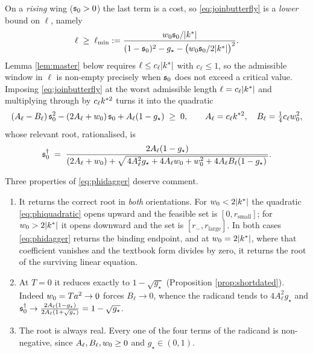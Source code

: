 On a \emph{rising} wing ($\mathfrak{s}_{0}>0$) the last term is a cost, so \eqref{eq:joinbutterfly} is a
\emph{lower} bound on $\ell$, namely
\begin{equation}\label{eq:ellmin}
  \ell\;\ge\;\ell_{\min}:=\frac{w_{0}\mathfrak{s}_{0}/|k^{*}|}
  {(1-\mathfrak{s}_{0})^{2}-g_{\star}-\bigl(w_{0}\mathfrak{s}_{0}/2|k^{*}|\bigr)^{2}} .
\end{equation}
Lemma \ref{lem:master} below requires $\ell\le c_{\ell}|k^{*}|$ with $c_{\ell}\le1$, so the
admissible window in $\ell$ is non-empty precisely when $\mathfrak{s}_{0}$ does not exceed a critical
value. Imposing \eqref{eq:joinbutterfly} at the worst admissible length $\ell=c_{\ell}|k^{*}|$ and
multiplying through by $c_{\ell}k^{*2}$ turns it into the quadratic
\begin{equation}\label{eq:phiquadratic}
  (A_{\ell}-B_{\ell})\,\mathfrak{s}_{0}^{2}-(2A_{\ell}+w_{0})\,\mathfrak{s}_{0}+A_{\ell}(1-g_{\star})\;\ge\;0,
  \qquad A_{\ell}=c_{\ell}k^{*2},\quad B_{\ell}=\tfrac14 c_{\ell}w_{0}^{2},
\end{equation}
whose relevant root, rationalised, is
\begin{equation}
  \mathfrak{s}_{0}^{\dagger}
  \;=\;\frac{2A_{\ell}(1-g_{\star})}
            {(2A_{\ell}+w_{0})+\sqrt{\,4A_{\ell}^{2}g_{\star}+4A_{\ell}w_{0}+w_{0}^{2}+4A_{\ell}B_{\ell}(1-g_{\star})\,}} .
  \label{eq:phidagger}
\end{equation}

Three properties of \eqref{eq:phidagger} deserve comment.
\begin{enumerate}
  \item It returns the correct root in \emph{both} orientations. For $w_{0}<2|k^{*}|$ the
    quadratic \eqref{eq:phiquadratic} opens upward and the feasible set is
    $[0,r_{\mathrm{small}}]$; for $w_{0}>2|k^{*}|$ it opens downward and the set is
    $[r_{-},r_{\mathrm{large}}]$. In both cases \eqref{eq:phidagger} returns the binding endpoint,
    and at $w_{0}=2|k^{*}|$, where that coefficient vanishes and the textbook form divides by
    zero, it returns the root of the surviving linear equation.
  \item At $T=0$ it reduces exactly to $1-\sqrt{g_{\star}}$ (Proposition
    \ref{prop:shortdated}). Indeed $w_{0}=Ta^{2}\to0$ forces $B_{\ell}\to0$, whence the radicand
    tends to $4A_{\ell}^{2}g_{\star}$ and
    $\mathfrak{s}_{0}^{\dagger}\to\frac{2A_{\ell}(1-g_{\star})}{2A_{\ell}(1+\sqrt{g_{\star}})}=1-\sqrt{g_{\star}}$.
  \item The root is always real. Every one of the four terms of the radicand is non-negative, since
    $A_{\ell},B_{\ell},w_{0}\ge0$ and $g_{\star}\in(0,1)$.
\end{enumerate}

